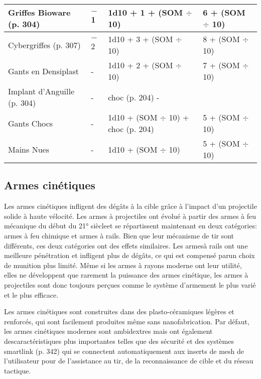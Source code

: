 \begin{table}
\begin{tabularx}{\textwidth}{|l|X|l|l|}
Griffes Bioware (p. 304)	&$-$1	&1d10 + 1 + (SOM $\div$ 10)	&6 + (SOM $\div$ 10) \\ \hline

Cybergriffes (p. 307)	&$-$2	&1d10 + 3 + (SOM $\div$ 10)	&8 + (SOM $\div$ 10) \\ \hline

Gants en Densiplast	&- &1d10 + 2 + (SOM $\div$ 10)	&7 + (SOM $\div$ 10) \\ \hline

Implant d'Anguille (p. 304)	&- &choc (p. 204)	- \\ \hline

Gants Chocs	&- &1d10 + (SOM $\div$ 10) + choc (p. 204)	&5 + (SOM $\div$ 10) \\ \hline

Mains Nues	&- &1d10 + (SOM $\div$ 10)	&5 + (SOM $\div$ 10) \\ \hline

\end{tabularx} \label{tab:meleeweapons} \end{table} 



\subsection{Armes cinétiques} \label{sec:kinetic-weapons} 

Les armes cinétiques infligent des dégâts à la cible grâce à l'impact d'un projectile solide à haute vélocité. Les armes à projectiles ont évolué à partir des armes à feu mécanique du début du 21° siècleet se répartissent maintenant en deux catégories: armes à feu chimique et armes à rails. Bien que leur mécanisme de tir sont différents, ces deux catégories ont des effets similaires. Les armesà rails ont une meilleure pénétration et infligent plus de dégâts, ce qui est compensé parun choix de munition plus limité. Même si les armes à rayons moderne ont leur utilité, elles ne développent que rarement la puissance des armes cinétique, les armes à projectiles sont donc toujours perçues comme le système d'armement le plus varié et le plus efficace. 

Les armes cinétiques sont construites dans des plasto-céramiques légères et renforcés, qui sont facilement produites même sans nanofabrication. Par défaut, les armes cinétiques modernes sont ambidextres mais ont également descaractéristiques plus importantes telles que des sécurité et des systèmes smartlink (p. 342) qui se connectent automatiquement aux inserts de mesh de l'utilisateur pour de l'assistance au tir, de la reconnaissance de cible et du réseau tactique. 

